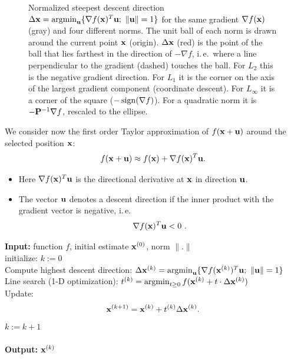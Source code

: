\begin{figure}[htbp]
    \caption{Normalized steepest descent direction $\Delta\bm{\mathrm{x}}=\operatorname*{argmin}_{\bm{\mathrm{u}}}\{\nabla f(\bm{\mathrm{x}})^T\bm{\mathrm{u}};\ \|\bm{\mathrm{u}}\|=1\}$ for the same gradient $\nabla f(\bm{\mathrm{x}})$ (gray) and four different norms. The unit ball of each norm is drawn around the current point $\bm{\mathrm{x}}$ (origin). $\Delta\bm{\mathrm{x}}$ (red) is the point of the ball that lies farthest in the direction of $-\nabla f$, i.\,e.\ where a line perpendicular to the gradient (dashed) touches the ball. For $L_2$ this is the negative gradient direction. For $L_1$ it is the corner on the axis of the largest gradient component (coordinate descent). For $L_\infty$ it is a corner of the square ($-\operatorname{sign}(\nabla f)$). For a quadratic norm it is $-\mathbf{P}^{-1}\nabla f$, rescaled to the ellipse.}
    \label{fig:steepest_descent}
  \end{figure}
  We consider now the first order Taylor approximation of $f(\bm{\mathrm{x}} +\bm{\mathrm{u}})$ around the selected position $\bm{\mathrm{x}}$:
  \begin{displaymath}
    f(\bm{\mathrm{x}}+\bm{\mathrm{u}}) \approx f(\bm{\mathrm{x}}) + \nabla f(\bm{\mathrm{x}})^T \bm{\mathrm{u}}.
  \end{displaymath}
  \begin{itemize}
    \item Here $ \nabla f(\bm{\mathrm{x}})^T \bm{\mathrm{u}}$ is the directional derivative at $\bm{\mathrm{x}}$ in direction $\bm{\mathrm{u}}$.
    \item The vector $\bm{\mathrm{u}}$ denotes a descent direction if the inner product with the gradient vector is negative, i.\,e.
      \begin{displaymath}
        \nabla f(\bm{\mathrm{x}})^T \bm{\mathrm{u}} < 0~.
      \end{displaymath}
  \end{itemize}
 
  \begin{algorithmic}
    \STATE \textbf{Input:} function $f$, initial estimate $\bm{\mathrm{x}}^{(0)}$, norm $\|.\|$\\
    \STATE initialize: $k:=0$\\
    \Repeat
      \STATE Compute highest descent direction: $\Delta \bm{\mathrm{x}} ^{(k)}= \operatorname*{argmin}_{\bm{\mathrm{u}}} \{\nabla f(\bm{\mathrm{x}}^{(k)})^T \bm{\mathrm{u}} ; \ \| \bm{\mathrm{u}}\| = 1\}$\\
      \STATE Line search (1-D optimization): $t^{(k)}= \operatorname*{argmin}_{t \geq 0}f(\bm{\mathrm{x}}^{(k)}+t\cdot \Delta\bm{\mathrm{x}}^{(k)})$\\
      \STATE Update:
        \begin{displaymath}
          \bm{\mathrm{x}}^{(k+1)} = \bm{\mathrm{x}}^{(k)} + t^{(k)}\Delta \bm{\mathrm{x}}^{(k)} .
        \end{displaymath}
      \STATE $k:=k+1$\\
    \\
    \STATE \textbf{Output:} $\bm{\mathrm{x}}^{(k)}$\\
  \end{algorithmic}
 
